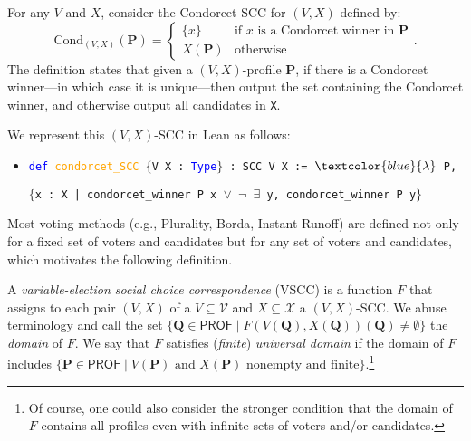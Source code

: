 \documentclass[runningheads]{llncs}
\begin{document}

\begin{example}\label{CondorcetEx1} For any $V$ and $X$, consider the Condorcet SCC for $(V,X)$ defined by:
\[\mathrm{Cond}_{(V,X)}(\mathbf{P})=\begin{cases} \{x\} & \mbox{if $x$ is a Condorcet winner in $\mathbf{P}$} \\ X(\mathbf{P}) & \mbox{otherwise}\end{cases}.\]
The definition states that given a $(V,X)$-profile $\mathbf{P}$, if there is a Condorcet winner---in which case it is unique---then output the set containing the Condorcet winner, and otherwise output all candidates in \texttt{X}.

We represent this $(V,X)$-SCC in Lean as follows:
\begin{itemize}
\item[] \texttt{\textcolor{blue}{def} \textcolor{orange}{condorcet\_SCC} $\{$V X : \textcolor{blue}{Type}$\}$ : SCC V X := $\textcolor{blue}{\lambda}$ P, }

\texttt{$\{$x : X |  condorcet\_winner P x $\vee$ $\neg$ $\exists$ y, condorcet\_winner P y$\}$}
\end{itemize}
\end{example}

Most voting methods (e.g., Plurality, Borda, Instant Runoff) are defined not only for a fixed set of voters and candidates but for any set of voters and candidates, which motivates the following definition.

\begin{definition}\label{VSCC} \textnormal{A \textit{variable-election social choice correspondence} (VSCC) is a function $F$ that assigns to each pair $(V,X)$ of a $V\subseteq \mathcal{V}$ and $X\subseteq\mathcal{X}$ a $(V,X)$-SCC. We abuse terminology and call the set $\{\mathbf{Q}\in\mathsf{PROF}\mid F(V(\mathbf{Q}),X(\mathbf{Q}))(\mathbf{Q})\neq\emptyset \}$ the \textit{domain} of  $F$. We say that $F$ satisfies  (\textit{finite}) \textit{universal domain} if the domain of $F$ includes $\{\mathbf{P}\in \mathsf{PROF}\mid V(\mathbf{P}) \mbox{ and }X(\mathbf{P}) \mbox{ nonempty and finite}\}$.}\footnote{Of course, one could also consider the stronger condition that the domain of $F$ contains all profiles even with infinite sets of voters and/or candidates.}
\end{definition}
\end{document}
